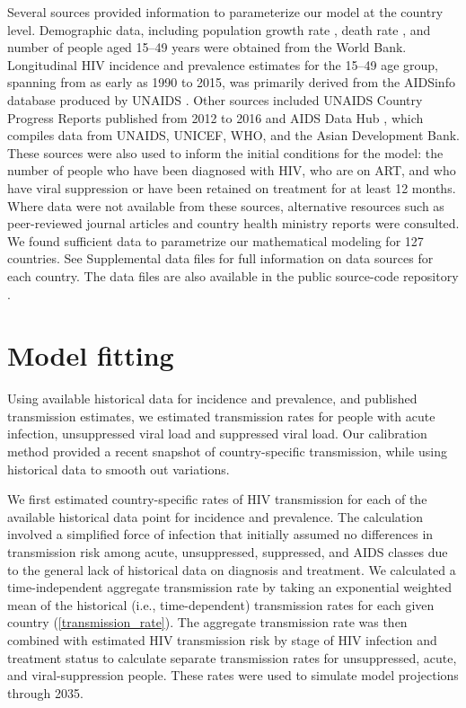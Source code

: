 \documentclass[11pt]{article}
\begin{document}
Several sources provided information to parameterize our model at the
country level. Demographic data, including population growth rate
\cite{WorldBankpg}, death rate
\cite{World_Development_Indicators2013-ee}, and number of people aged
15--49 years \cite{The_World_Bank2016-fd} were obtained from the World
Bank. Longitudinal HIV incidence and prevalence estimates for the
15--49 age group, spanning from as early as 1990 to 2015, was
primarily derived from the AIDSinfo database produced by UNAIDS
\cite{Unaids2016-an}. Other sources included UNAIDS Country Progress
Reports \cite{Unaids2016-am} published from 2012 to 2016 and AIDS Data
Hub \cite{AIDSdatahub-fg}, which compiles data from UNAIDS, UNICEF,
WHO, and the Asian Development Bank. These sources were also used to
inform the initial conditions for the model: the number of people who
have been diagnosed with HIV, who are on ART, and who have viral
suppression or have been retained on treatment for at least 12
months. Where data were not available from these sources, alternative
resources such as peer-reviewed journal articles and country health
ministry reports were consulted.  We found sufficient data to
parametrize our mathematical modeling for 127 countries.  See
Supplemental data files for full information on data sources for each
country.  The data files are also available in the public source-code
repository \cite{medlock2016-git}.


\section{Model fitting}
\label{model_fitting}

Using available historical data for incidence and prevalence, and
published transmission estimates, we estimated transmission rates for
people with acute infection, unsuppressed viral load and suppressed
viral load. Our calibration method provided a recent snapshot of
country-specific transmission, while using historical data to smooth
out variations.

We first estimated country-specific rates of HIV transmission for each
of the available historical data point for incidence and
prevalence. The calculation involved a simplified force of infection
that initially assumed no differences in transmission risk among
acute, unsuppressed, suppressed, and AIDS classes due to the general
lack of historical data on diagnosis and treatment. We calculated a
time-independent aggregate transmission rate by taking an exponential
weighted mean of the historical (i.e., time-dependent) transmission
rates for each given country (\autoref{transmission_rate}). The
aggregate transmission rate was then combined with estimated HIV
transmission risk by stage of HIV infection
\cite{Hollingsworth2008-iy} and treatment status \cite{Wawer2005-us}
to calculate separate transmission rates for unsuppressed, acute, and
viral-suppression people. These rates were used to simulate model
projections through 2035.
\end{document}
